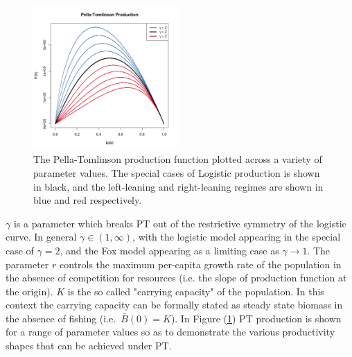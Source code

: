 %
\begin{figure} %
\vspace{-1cm}
\includegraphics[width=0.49\textwidth]{../ptNew/g4PT.png}
\vspace{-1cm}
\caption{
The Pella-Tomlinson production function plotted across a variety of parameter
values. The special cases of Logistic production is shown in black, and the
left-leaning and right-leaning regimes are shown in blue and red respectively.
}
\label{SrrPT}
\end{figure}

%
$\gamma$ is a parameter which breaks PT out of the restrictive symmetry of the
logistic curve. In general $\gamma\in(1, \infty)$, with the logistic model
appearing in the special case of $\gamma=2$, and the Fox model appearing as
a limiting case as $\gamma\to1$.
%
The parameter $r$ controls the maximum per-capita growth rate of the population
in the absence of competition for resources (i.e. the slope of production
function at the origin). $K$ is the so called "carrying capacity" of the
population. In this context the carrying capacity can be formally stated as
steady state biomass in the absence of fishing \mbox{(i.e. $\bar B(0)=K$).}
%
In Figure (\ref{SrrPT}) PT production is shown for a range of parameter values
so as to demonstrate the various productivity shapes that can be achieved under
PT.

